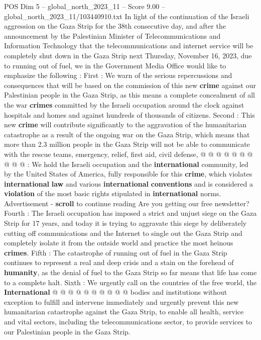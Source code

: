 \begin{textsample}{POS Dim 5 – global\_north\_2023\_11 – Score 9.00 – global\_north\_2023\_11/103440910.txt}  \label{ex:f5_pos_418}
In light of the continuation of the Israeli aggression on the Gaza Strip for the 38th consecutive day, and after the announcement by the Palestinian Minister of Telecommunications and Information Technology that the telecommunications and internet service will be completely shut down in the Gaza Strip next Thursday, November 16, 2023, due to running out of fuel, we in the Government Media Office would like to emphasize the following : First : We warn of the serious repercussions and consequences that will be based on the commission of this new \textbf{crime} against our Palestinian people in the Gaza Strip, as this means a complete concealment of all the war \textbf{crimes} committed by the Israeli occupation around the clock against hospitals and homes and against hundreds of thousands of citizens.
Second : This new \textbf{crime} will contribute significantly to the aggravation of the humanitarian catastrophe as a result of the ongoing war on the Gaza Strip, which means that more than 2.3 million people in the Gaza Strip will not be able to communicate with the rescue teams, emergency, relief, first aid, civil defense, @ @ @ @ @ @ @ @ @ @ : We hold the Israeli occupation and the \textbf{international} community, led by the United States of America, fully responsible for this \textbf{crime}, which violates \textbf{international} \textbf{law} and various \textbf{international} \textbf{conventions} and is considered a \textbf{violation} of the most basic rights stipulated in \textbf{international} norms.
Advertisement - \textbf{scroll} to continue reading Are you getting our free newsletter?
Fourth : The Israeli occupation has imposed a strict and unjust siege on the Gaza Strip for 17 years, and today it is trying to aggravate this siege by deliberately cutting off communications and the Internet to single out the Gaza Strip and completely isolate it from the outside world and practice the most heinous \textbf{crimes}.
Fifth : The catastrophe of running out of fuel in the Gaza Strip continues to represent a real and deep crisis and a stain on the forehead of \textbf{humanity}, as the denial of fuel to the Gaza Strip so far means that life has come to a complete halt.
Sixth : We urgently call on the countries of the free world, the \textbf{International} @ @ @ @ @ @ @ @ @ @ bodies and institutions without exception to fulfill and intervene immediately and urgently prevent this new humanitarian catastrophe against the Gaza Strip, to enable all health, service and vital sectors, including the telecommunications sector, to provide services to our Palestinian people in the Gaza Strip.

\end{textsample}
